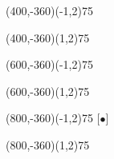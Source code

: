 \documentclass[12pt]{article}
\begin{document}
\begin{figure}[htb]
\begin{egame}
\renewcommand{\egarrowstyle}{}

\putbranch(400,-360)(-1,2){75}

\renewcommand{\egarrowstyle}{}

\putbranch(400,-360)(1,2){75}






\renewcommand{\egarrowstyle}{}

\putbranch(600,-360)(-1,2){75}

\renewcommand{\egarrowstyle}{}

\putbranch(600,-360)(1,2){75}




\renewcommand{\egarrowstyle}{e}

\putbranch(800,-360)(-1,2){75}
[$\bullet$]

\renewcommand{\egarrowstyle}{}

\putbranch(800,-360)(1,2){75}






\end{egame}
\end{figure}
\end{document}
